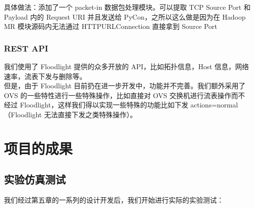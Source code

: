 \documentclass[a4paper, 11pt]{article}                                                   %
\begin{document}
\begin{CJK*}{UTF8}{song}
具体做法：添加了一个 packet-in 数据包处理模块。可以提取 TCP Source Port 和 Payload 内的 Request URI 并且发送给 PyCon，之所以这么做是因为在 Hadoop MR 模块源码内无法通过 HTTPURLConnection 直接拿到 Source Port
\subsubsection{REST API}
我们使用了 Floodlight 提供的众多开放的 API，比如拓扑信息，Host 信息，网络速率，流表下发与删除等。\\
但是，由于 Floodlight 目前扔在进一步开发中，功能并不完善。我们额外采用了 OVS 的一些特性进行一些特殊操作，比如直接对 OVS 交换机进行流表操作而不经过 Floodlight，这样我们得以实现一些特殊的功能比如下发 actions=normal（Floodlight 无法直接下发之类特殊操作）。
\section{项目的成果}
\subsection{实验仿真测试}
我们经过第五章的一系列的设计开发后，我们开始进行实际的实验测试：


\end{CJK*}
\end{document}
